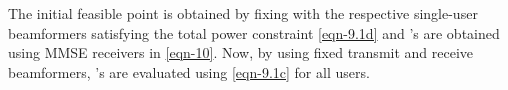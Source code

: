 The initial feasible point  is obtained by fixing  with the respective single-user beamformers satisfying the total power constraint \eqref{eqn-9.1d} and 's are obtained using \ac{MMSE} receivers in \eqref{eqn-10}. Now, by using fixed transmit and receive beamformers, 's are evaluated using \eqref{eqn-9.1c} for all users. 	
	
